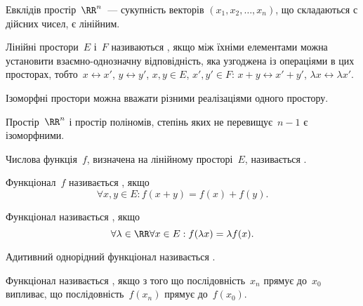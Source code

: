 \begin{example}
Евклідів простір~$\RR^n$~--- сукупність векторів
$(x_1, x_2, \dots, x_n)$, що складаються с дійсних чисел, є лінійним.
\end{example}

\begin{definition}
Лінійні простори~$E$ і~$F$ називаються
, якщо між їхніми елементами можна
установити взаємно-однозначну відповідність, яка
узгоджена із операціями в цих просторах, тобто~$x \leftrightarrow x'$,
$y \leftrightarrow y'$, $x, y \in E$, $x', y' \in F$: $x + y \leftrightarrow x' + y'$, $\lambda x \leftrightarrow \lambda x'$.
\end{definition}

\begin{remark}
Ізоморфні простори можна вважати різними реалізаціями
одного простору.
\end{remark}

\begin{example}
Простір~$\RR^n$ і простір поліномів, степінь яких
не перевищує~$n - 1$ є ізоморфними.
\end{example}

\begin{definition}
Числова функція~$f$, визначена на лінійному
просторі~$E$, називається .
\end{definition}

\begin{definition}
Функціонал~$f$ називається , якщо
\begin{equation*}
    \forall x, y \in E: f(x + y) = f(x) + f (y).
\end{equation*}
\end{definition}

\begin{definition}
Функціонал називається , якщо
\begin{equation*}
    \forall \lambda \in \RR \forall x \in E: f(\lambda x) = \lambda f(x).
\end{equation*}
\end{definition}

\begin{definition}
Адитивний однорідний функціонал називається .
\end{definition}

\begin{definition}
Функціонал називається ,
якщо з того що послідовність~$x_n$ прямує до~$x_0$
випливає, що послідовність~$f(x_n)$ прямує до~$f(x_0)$.
\end{definition}

